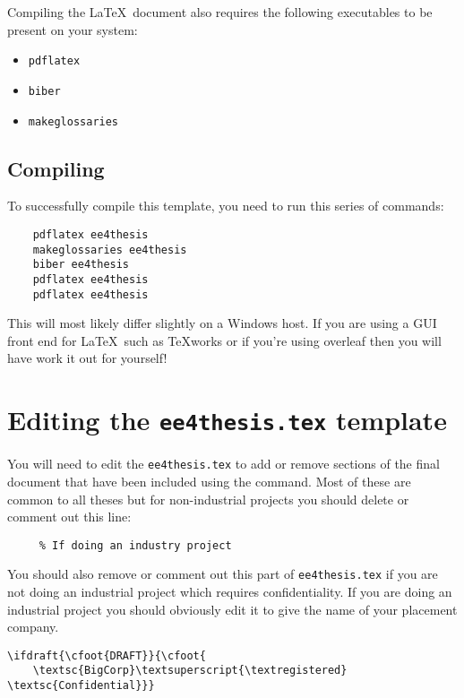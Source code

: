 \documentclass[a4paper,12pt]{article}
\begin{document}
Compiling the \LaTeX~document also requires the following executables to be
present on your system:

\begin{itemize}
	\item \verb+pdflatex+
	\item \verb+biber+
	\item \verb+makeglossaries+
\end{itemize}

\subsection{Compiling}

To successfully compile this template, you need to run this series of commands:
\begin{verbatim}
    pdflatex ee4thesis
    makeglossaries ee4thesis
    biber ee4thesis
    pdflatex ee4thesis
    pdflatex ee4thesis
\end{verbatim}

This will most likely differ slightly on a Windows host.  If you are using a
GUI front end for \LaTeX~such as TeXworks or if you're using overleaf then you will have work it out for
yourself!

\section{Editing the \texttt{ee4thesis.tex} template}

You will need to edit the \verb+ee4thesis.tex+ to add or remove sections of the
final document that have been included using the \verb++ command.  Most
of these are common to all theses but for non-industrial projects you should
delete or comment out this line:

\begin{verbatim}
     % If doing an industry project
\end{verbatim}

You should also remove or comment out this part of \verb+ee4thesis.tex+ if you
are not doing an industrial project which requires confidentiality.  If you are
doing an industrial project you should obviously edit it to give the name of
your placement company.

\begin{verbatim}
\ifdraft{\cfoot{DRAFT}}{\cfoot{
    \textsc{BigCorp}\textsuperscript{\textregistered} \textsc{Confidential}}}
\end{verbatim}
\end{document}

